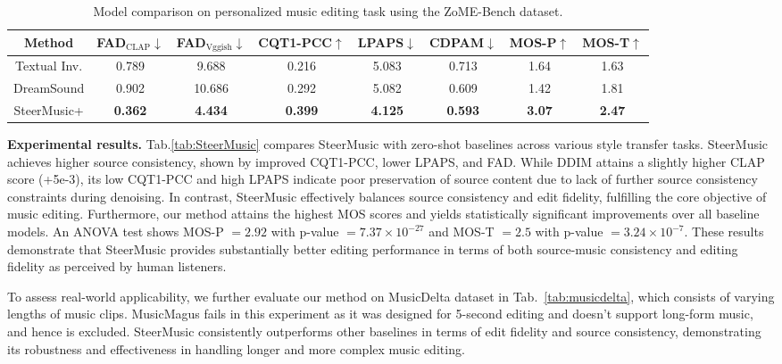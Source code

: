 \begin{table}[t]
  \centering
  {\fontsize{8pt}{9pt}\selectfont
  \begin{tabular}{c|ccccc|cc}
    \toprule
    Method   & FAD$_{\text{CLAP}}$$\downarrow$& FAD$_{\text{Vggish}}$$\downarrow$ & CQT1-PCC$\uparrow$ & LPAPS$\downarrow$& CDPAM$\downarrow$ &  MOS-P$\uparrow$ &  MOS-T$\uparrow$ \\
    \midrule
    Textual Inv. & 0.789 & 9.688 & 0.216 & 5.083 & 0.713 & 1.64 & 1.63\\
    DreamSound& 0.902 &10.686  & 0.292  & 5.082 & 0.609 & 1.42 & 1.81\\
    SteerMusic+ & \textbf{0.362} & \textbf{4.434}&\textbf{0.399} & \textbf{4.125} & \textbf{0.593} &\textbf{3.07} &\textbf{2.47}\\
    \bottomrule
  \end{tabular}
  }
  \caption{Model comparison on personalized music editing task using the ZoME-Bench dataset.}\label{tab:SteerMusic+_overall}
\end{table}

\textbf{Experimental results.}
Tab.\ref{tab:SteerMusic} compares SteerMusic with zero-shot baselines across various style transfer tasks. SteerMusic achieves higher source consistency, shown by improved CQT1-PCC, lower LPAPS, and FAD. While DDIM attains a slightly higher CLAP score (+5e-3), its low CQT1-PCC and high LPAPS indicate poor preservation of source content due to lack of further source consistency constraints during denoising.
In contrast, SteerMusic effectively balances source consistency and edit fidelity, fulfilling the core objective of music editing.
Furthermore, our method attains the highest MOS scores and yields statistically significant improvements over all baseline models. An ANOVA test shows MOS-P $=2.92$ with p-value $=7.37\times10^{-27}$ and MOS-T $=2.5$ with p-value $=3.24\times10^{-7}$. These results demonstrate that SteerMusic provides substantially better editing performance in terms of both source-music consistency and editing fidelity as perceived by human listeners.

To assess real-world applicability, we further evaluate our method on MusicDelta dataset in Tab.~\ref{tab:musicdelta}, which consists of varying lengths of music clips. MusicMagus fails in this experiment as it was designed for 5-second editing and doesn't support long-form music, and hence is excluded. SteerMusic consistently outperforms other baselines in terms of edit fidelity and source consistency, demonstrating its robustness and effectiveness in handling longer and more complex music editing.

